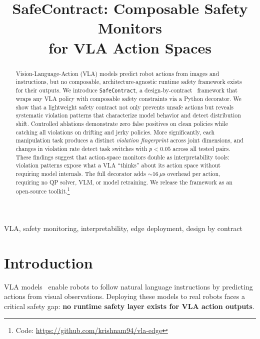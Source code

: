 \documentclass[conference]{IEEEtran}
\begin{document}
\title{SafeContract: Composable Safety Monitors\\for VLA Action Spaces}

\author{
}

\maketitle

\begin{abstract}
Vision-Language-Action (VLA) models predict robot actions from images and instructions, but no composable, architecture-agnostic runtime safety framework exists for their outputs.
We introduce \texttt{SafeContract}, a design-by-contract~\cite{meyer1992} framework that wraps any VLA policy with composable safety constraints via a Python decorator.
We show that a lightweight safety contract not only prevents unsafe actions but reveals systematic violation patterns that characterize model behavior and detect distribution shift.
Controlled ablations demonstrate zero false positives on clean policies while catching all violations on drifting and jerky policies.
More significantly, each manipulation task produces a distinct \emph{violation fingerprint} across joint dimensions, and changes in violation rate detect task switches with $p < 0.05$ across all tested pairs.
These findings suggest that action-space monitors double as interpretability tools: violation patterns expose what a VLA ``thinks'' about its action space without requiring model internals.
The full decorator adds ${\sim}$16\,$\mu$s overhead per action, requiring no QP solver, VLM, or model retraining.
We release the framework as an open-source toolkit.\footnote{Code: \url{https://github.com/krishnam94/vla-edge}}
\end{abstract}

\begin{IEEEkeywords}
VLA, safety monitoring, interpretability, edge deployment, design by contract
\end{IEEEkeywords}

\section{Introduction}

VLA models~\cite{openvla,smolvla} enable robots to follow natural language instructions by predicting actions from visual observations.
Deploying these models to real robots faces a critical safety gap: \textbf{no runtime safety layer exists for VLA action outputs}.
\end{document}
